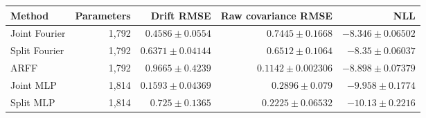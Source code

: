 \begin{tabular}{lrrrr}\toprule Method & Parameters & Drift RMSE & Raw covariance RMSE & NLL\\\midrule
Joint Fourier & 1,792 & $0.4586\pm 0.0554$ & $0.7445\pm 0.1668$ & $-8.346\pm 0.06502$\\
Split Fourier & 1,792 & $0.6371\pm 0.04144$ & $0.6512\pm 0.1064$ & $-8.35\pm 0.06037$\\
ARFF & 1,792 & $0.9665\pm 0.4239$ & $0.1142\pm 0.002306$ & $-8.898\pm 0.07379$\\
Joint MLP & 1,814 & $0.1593\pm 0.04369$ & $0.2896\pm 0.079$ & $-9.958\pm 0.1774$\\
Split MLP & 1,814 & $0.725\pm 0.1365$ & $0.2225\pm 0.06532$ & $-10.13\pm 0.2216$\\
\bottomrule\end{tabular}
